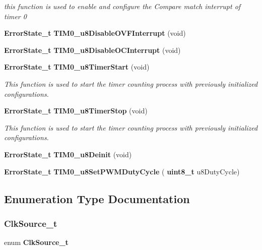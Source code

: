 \begin{DoxyCompactItemize}
\begin{DoxyCompactList}\small\item\em this function is used to enable and configure the Compare match interrupt of timer 0 \end{DoxyCompactList}\item 
\textbf{ Error\+State\+\_\+t} \textbf{ T\+I\+M0\+\_\+u8\+Disable\+O\+V\+F\+Interrupt} (void)
\item 
\textbf{ Error\+State\+\_\+t} \textbf{ T\+I\+M0\+\_\+u8\+Disable\+O\+C\+Interrupt} (void)
\item 
\textbf{ Error\+State\+\_\+t} \textbf{ T\+I\+M0\+\_\+u8\+Timer\+Start} (void)
\begin{DoxyCompactList}\small\item\em This function is used to start the timer counting process with previously initialized configurations. \end{DoxyCompactList}\item 
\textbf{ Error\+State\+\_\+t} \textbf{ T\+I\+M0\+\_\+u8\+Timer\+Stop} (void)
\begin{DoxyCompactList}\small\item\em This function is used to start the timer counting process with previously initialized configurations. \end{DoxyCompactList}\item 
\textbf{ Error\+State\+\_\+t} \textbf{ T\+I\+M0\+\_\+u8\+Deinit} (void)
\item 
\textbf{ Error\+State\+\_\+t} \textbf{ T\+I\+M0\+\_\+u8\+Set\+P\+W\+M\+Duty\+Cycle} (\textbf{ uint8\+\_\+t} u8\+Duty\+Cycle)
\end{DoxyCompactItemize}


\subsection{Enumeration Type Documentation}
\mbox{\label{_t_i_m_e_r0__interface_8h_ab9c5e315444772abc479b22b3556fe44}} 
\subsubsection{Clk\+Source\+\_\+t}
{\footnotesize\ttfamily enum \textbf{ Clk\+Source\+\_\+t}}

